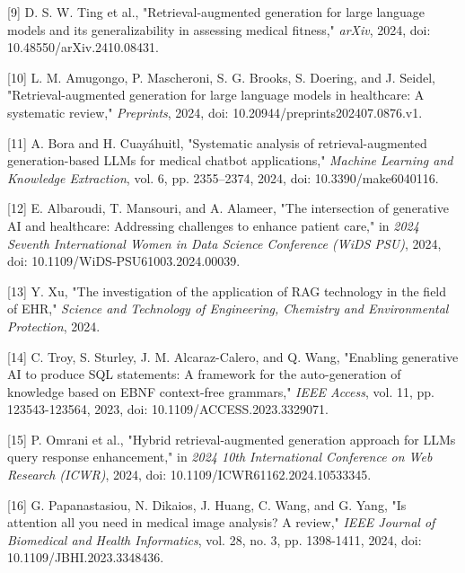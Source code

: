 [9] D. S. W. Ting et al., "Retrieval-augmented generation for large language models and its generalizability in assessing medical fitness," \textit{arXiv}, 2024, doi: 10.48550/arXiv.2410.08431.

[10] L. M. Amugongo, P. Mascheroni, S. G. Brooks, S. Doering, and J. Seidel, "Retrieval-augmented generation for large language models in healthcare: A systematic review," \textit{Preprints}, 2024, doi: 10.20944/preprints202407.0876.v1.

[11] A. Bora and H. Cuayáhuitl, "Systematic analysis of retrieval-augmented generation-based LLMs for medical chatbot applications," \textit{Machine Learning and Knowledge Extraction}, vol. 6, pp. 2355–2374, 2024, doi: 10.3390/make6040116.

[12] E. Albaroudi, T. Mansouri, and A. Alameer, "The intersection of generative AI and healthcare: Addressing challenges to enhance patient care," in \textit{2024 Seventh International Women in Data Science Conference (WiDS PSU)}, 2024, doi: 10.1109/WiDS-PSU61003.2024.00039.

[13] Y. Xu, "The investigation of the application of RAG technology in the field of EHR," \textit{Science and Technology of Engineering, Chemistry and Environmental Protection}, 2024.

[14] C. Troy, S. Sturley, J. M. Alcaraz-Calero, and Q. Wang, "Enabling generative AI to produce SQL statements: A framework for the auto-generation of knowledge based on EBNF context-free grammars," \textit{IEEE Access}, vol. 11, pp. 123543-123564, 2023, doi: 10.1109/ACCESS.2023.3329071.

[15] P. Omrani et al., "Hybrid retrieval-augmented generation approach for LLMs query response enhancement," in \textit{2024 10th International Conference on Web Research (ICWR)}, 2024, doi: 10.1109/ICWR61162.2024.10533345.

[16] G. Papanastasiou, N. Dikaios, J. Huang, C. Wang, and G. Yang, "Is attention all you need in medical image analysis? A review," \textit{IEEE Journal of Biomedical and Health Informatics}, vol. 28, no. 3, pp. 1398-1411, 2024, doi: 10.1109/JBHI.2023.3348436.

\newpage 